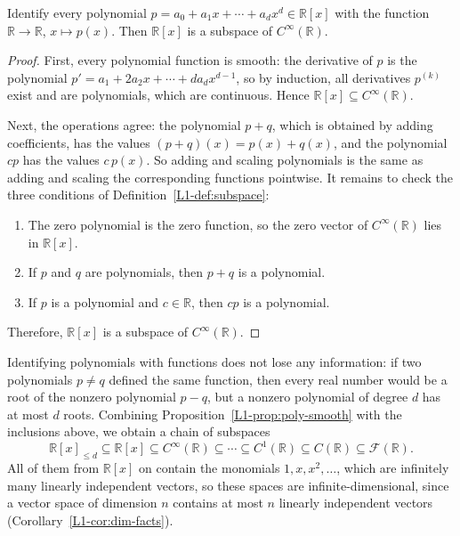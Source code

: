 \begin{proposition}\label{L1-prop:poly-smooth}
    Identify every polynomial $p = a_0 + a_1x + \cdots + a_dx^d \in \mathbb{R}[x]$ with the function $\mathbb{R} \to \mathbb{R}$, $x \mapsto p(x)$. Then $\mathbb{R}[x]$ is a subspace of $C^\infty(\mathbb{R})$.
\end{proposition}

\begin{proof}
    First, every polynomial function is smooth: the derivative of $p$ is the polynomial $p' = a_1 + 2a_2x + \cdots + da_dx^{d-1}$, so by induction, all derivatives $p^{(k)}$ exist and are polynomials, which are continuous. Hence $\mathbb{R}[x] \subseteq C^\infty(\mathbb{R})$.

    Next, the operations agree: the polynomial $p + q$, which is obtained by adding coefficients, has the values $(p + q)(x) = p(x) + q(x)$, and the polynomial $cp$ has the values $c\,p(x)$. So adding and scaling polynomials is the same as adding and scaling the corresponding functions pointwise. It remains to check the three conditions of Definition~\ref{L1-def:subspace}:
    \begin{enumerate}
        \item The zero polynomial is the zero function, so the zero vector of $C^\infty(\mathbb{R})$ lies in $\mathbb{R}[x]$.
        \item If $p$ and $q$ are polynomials, then $p + q$ is a polynomial.
        \item If $p$ is a polynomial and $c \in \mathbb{R}$, then $cp$ is a polynomial.
    \end{enumerate}
    Therefore, $\mathbb{R}[x]$ is a subspace of $C^\infty(\mathbb{R})$.
\end{proof}

Identifying polynomials with functions does not lose any information: if two polynomials $p \neq q$ defined the same function, then every real number would be a root of the nonzero polynomial $p - q$, but a nonzero polynomial of degree $d$ has at most $d$ roots. Combining Proposition~\ref{L1-prop:poly-smooth} with the inclusions above, we obtain a chain of subspaces
\[\mathbb{R}[x]_{\leq d} \subseteq \mathbb{R}[x] \subseteq C^\infty(\mathbb{R}) \subseteq \cdots \subseteq C^1(\mathbb{R}) \subseteq C(\mathbb{R}) \subseteq \mathcal{F}(\mathbb{R}).\]
All of them from $\mathbb{R}[x]$ on contain the monomials $1, x, x^2, \ldots$, which are infinitely many linearly independent vectors, so these spaces are infinite-dimensional, since a vector space of dimension $n$ contains at most $n$ linearly independent vectors (Corollary~\ref{L1-cor:dim-facts}).

